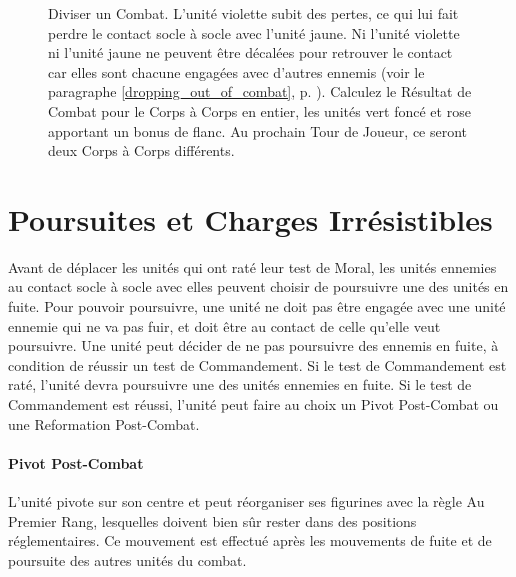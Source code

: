 \newcommand{\figSplitA}{a)}
\newcommand{\figSplitB}{b)}
\newcommand{\figSplitC}{c)}

\vspace*{10pt}
\begin{figure}[!htbp]
\def\svgwidth{\textwidth}

\caption{Diviser un Combat.\vspace*{10pt}\newline
L'unité violette subit des pertes, ce qui lui fait perdre le contact socle à socle avec l'unité jaune. Ni l'unité violette ni l'unité jaune ne peuvent être décalées pour retrouver le contact car elles sont chacune engagées avec d'autres ennemis (voir le paragraphe \ref{dropping_out_of_combat}, p. \pageref{dropping_out_of_combat}). Calculez le Résultat de Combat pour le Corps à Corps en entier, les unités vert foncé et rose apportant un bonus de flanc. Au prochain Tour de Joueur, ce seront deux Corps à Corps différents.}
\label{figure/splitting_combat}
\end{figure} 
 
\clearpage
\section{Poursuites et Charges Irrésistibles}

Avant de déplacer les unités qui ont raté leur test de Moral, les unités ennemies au contact socle à socle avec elles peuvent choisir de poursuivre une des unités en fuite. Pour pouvoir poursuivre, une unité ne doit pas être engagée avec une unité ennemie qui ne va pas fuir, et doit être au contact de celle qu'elle veut poursuivre. Une unité peut décider de ne pas poursuivre des ennemis en fuite, à condition de réussir un test de Commandement. Si le test de Commandement est raté, l'unité devra poursuivre une des unités ennemies en fuite. Si le test de Commandement est réussi, l'unité peut faire au choix un Pivot Post-Combat ou une Reformation Post-Combat. 

\hypertarget{postcombatpivots}{\paragraph{Pivot Post-Combat}}

L'unité pivote sur son centre et peut réorganiser ses figurines avec la règle Au Premier Rang, lesquelles doivent bien sûr rester dans des positions réglementaires. Ce mouvement est effectué après les mouvements de fuite et de poursuite des autres unités du combat.

